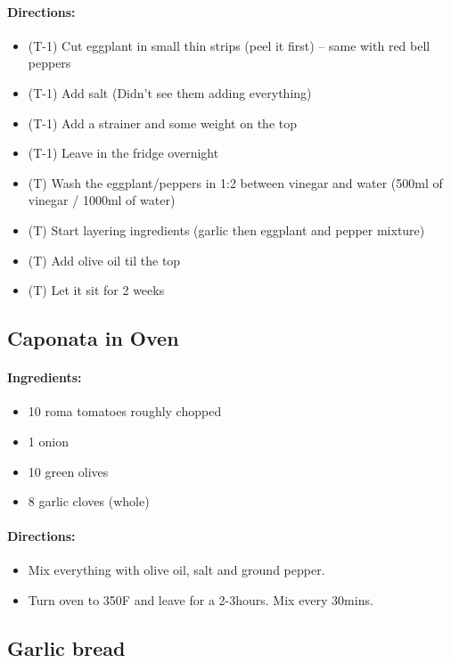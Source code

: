 \documentclass{article}
\begin{document}
\paragraph{Directions:}
\begin{itemize}
	\item (T-1) Cut eggplant in small thin strips (peel it first) -- same with red bell peppers
	\item (T-1) Add salt (Didn't see them adding everything)
	\item (T-1) Add a strainer and some weight on the top
	\item (T-1) Leave in the fridge overnight
	\item (T) Wash the eggplant/peppers in 1:2 between vinegar and water (500ml of vinegar / 1000ml of water)
	\item (T) Start layering ingredients (garlic then eggplant and pepper mixture)
	\item (T) Add olive oil til the top
	\item (T) Let it sit for 2 weeks
\end{itemize}

\subsection{Caponata in Oven}
\paragraph{Ingredients:}

\begin{itemize}
	\item 10 roma tomatoes roughly chopped
	\item 1 onion
	\item 10 green olives
	\item 8 garlic cloves (whole)
\end{itemize}

\paragraph{Directions:}
\begin{itemize}
	\item Mix everything with olive oil, salt and ground pepper.
	\item Turn oven to 350F and leave for a 2-3hours. Mix every 30mins.
\end{itemize}

\subsection{Garlic bread}
\end{document}
